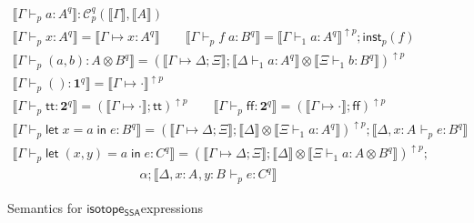 \documentclass[acmsmall,screen,review]{acmart}
\newcommand{\mc}[1]{\ensuremath{\mathcal{#1}}}
\newcommand{\mb}[1]{\ensuremath{\mathbf{#1}}}
\newcommand{\ms}[1]{\ensuremath{\mathsf{#1}}}
\newcommand{\lbl}[1]{{`#1}}
\newcommand{\ctt}{\ms{tt}}
\newcommand{\cff}{\ms{ff}}
\newcommand{\letexpr}[3]{\ensuremath{\ms{let}\;#1 = #2\;\ms{in}\;#3}}
\newcommand{\csplits}[3]{#1 \mapsto #2;#3}
\newcommand{\cwk}[2]{#1 \mapsto #2}
\newcommand{\thyp}[3]{#1: {#2}^{#3}}
\newcommand{\lhyp}[3]{#1[#2](#3)}
\newcommand{\llhyp}[3]{\lhyp{\lbl{#1}}{#2}{#3}}
\newcommand{\hasty}[5]{#1 \vdash_{#2} #3: {#4}^{#5}}
\newcommand{\haslb}[3]{#1 \vdash #2 \rhd #3}
\newcommand{\dnt}[1]{\llbracket{#1}\rrbracket}
\newcommand{\upg}[2]{{#1}^{\uparrow #2}}
\newcommand{\isotopessa}{\ms{isotope_{SSA}}}
\begin{document}
\begin{figure}
  \begin{gather*}
    \boxed{\dnt{\hasty{\Gamma}{p}{a}{A}{q}}
      : \mc{C}_p^q(\dnt{\Gamma}, \dnt{A})} 
      \\
    \dnt{\hasty{\Gamma}{p}{x}{A}{q}} 
      = \dnt{\cwk{\Gamma}{\thyp{x}{A}{q}}}
      \qquad
    \dnt{\hasty{\Gamma}{p}{f\;a}{B}{q}}
      = \upg{\dnt{\hasty{\Gamma}{1}{a}{A}{q}}}{p}
      ; \ms{inst}_p(f) 
      \\
    \dnt{\hasty{\Gamma}{p}{(a, b)}{A \otimes B}{q}}
      = \upg{(
        \dnt{\csplits{\Gamma}{\Delta}{\Xi}};
        \dnt{\hasty{\Delta}{1}{a}{A}{q}} \otimes
        \dnt{\hasty{\Xi}{1}{b}{B}{q}}
      )}{p} 
      \\
    \dnt{\hasty{\Gamma}{p}{()}{\mb{1}}{q}}
      = \upg{\dnt{\cwk{\Gamma}{\cdot}}}{p} 
      \\
    \dnt{\hasty{\Gamma}{p}{\ctt}{\mb{2}}{q}}
      = \upg{(\dnt{\cwk{\Gamma}{\cdot}};\ctt)}{p}
      \qquad
    \dnt{\hasty{\Gamma}{p}{\cff}{\mb{2}}{q}}
      = \upg{(\dnt{\cwk{\Gamma}{\cdot}};\cff)}{p} 
      \\
    \dnt{\hasty{\Gamma}{p}{\letexpr{x}{a}{e}}{B}{q}}
      = \upg{(
        \dnt{\csplits{\Gamma}{\Delta}{\Xi}}
        ; \dnt{\Delta} \otimes \dnt{\hasty{\Xi}{1}{a}{A}{q}}
      )}{p};\dnt{\hasty{\Delta, \thyp{x}{A}{}}{p}{e}{B}{q}} 
      \\
    \dnt{\hasty{\Gamma}{p}{\letexpr{(x, y)}{a}{e}}{C}{q}}
      = \upg{(
        \dnt{\csplits{\Gamma}{\Delta}{\Xi}}
        ; \dnt{\Delta} \otimes \dnt{\hasty{\Xi}{1}{a}{A \otimes B}{q}}
      )}{p}
      ; 
      \\ \qquad \qquad \qquad \qquad \qquad \alpha
      ; \dnt{\hasty{\Delta, \thyp{x}{A}{}, \thyp{y}{B}{}}{p}{e}{C}{q}}
  \end{gather*}
  \caption{Semantics for \isotopessa expressions}
  \label{fig:ssa-term-semantics}
\end{figure}
\end{document}
